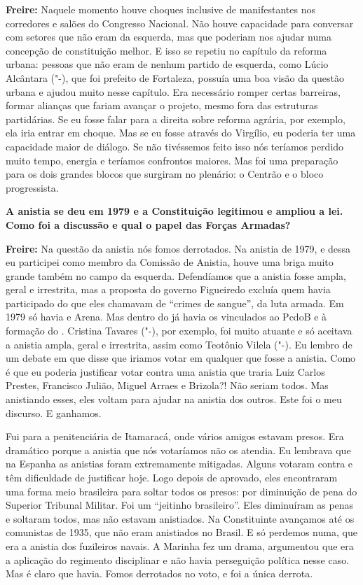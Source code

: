 \textbf{Freire:} Naquele momento houve choques inclusive de
manifestantes nos corredores e salões do Congresso Nacional. Não houve
capacidade para conversar com setores que não eram da esquerda, mas que
poderiam nos ajudar numa concepção de constituição melhor. E isso se
repetiu no capítulo da reforma urbana: pessoas que não eram de nenhum
partido de esquerda, como Lúcio Alcântara ("-), que foi prefeito de
Fortaleza, possuía uma boa visão da questão urbana e ajudou muito nesse
capítulo. Era necessário romper certas barreiras, formar alianças que
fariam avançar o projeto, mesmo fora das estruturas partidárias. Se eu
fosse falar para a direita sobre reforma agrária, por exemplo, ela iria
entrar em choque. Mas se eu fosse através do Virgílio, eu poderia ter
uma capacidade maior de diálogo. Se não tivéssemos feito isso nós
teríamos perdido muito tempo, energia e teríamos confrontos maiores. Mas
foi uma preparação para os dois grandes blocos que surgiram no plenário:
o Centrão e o bloco progressista.

\textbf{A anistia se deu em 1979 e a Constituição legitimou e ampliou a
lei. Como foi a discussão e qual o papel das Forças Armadas?}

\textbf{Freire:} Na questão da anistia nós fomos derrotados. Na anistia
de 1979, e dessa eu participei como membro da Comissão de Anistia, houve
uma briga muito grande também no campo da esquerda. Defendíamos que a
anistia fosse ampla, geral e irrestrita, mas a proposta do governo
Figueiredo excluía quem havia participado do que eles chamavam de
``crimes de sangue'', da luta armada. Em 1979 só havia  e Arena. Mas
dentro do  já havia os vinculados ao PcdoB e à formação do .
Cristina Tavares ("-), por exemplo, foi muito atuante e só aceitava
a anistia ampla, geral e irrestrita, assim como Teotônio Vilela
("-). Eu lembro de um debate em que disse que iriamos votar em
qualquer que fosse a anistia. Como é que eu poderia justificar votar
contra uma anistia que traria Luiz Carlos Prestes, Francisco Julião,
Miguel Arraes e Brizola?! Não seriam todos. Mas anistiando esses, eles
voltam para ajudar na anistia dos outros. Este foi o meu discurso. E
ganhamos.

Fui para a penitenciária de Itamaracá, onde vários amigos estavam
presos. Era dramático porque a anistia que nós votaríamos não os
atendia. Eu lembrava que na Espanha as anistias foram extremamente
mitigadas. Alguns votaram contra e têm dificuldade de justificar hoje.
Logo depois de aprovado, eles encontraram uma forma meio brasileira para
soltar todos os presos: por diminuição de pena do Superior Tribunal
Militar. Foi um ``jeitinho brasileiro''. Eles diminuíram as penas e
soltaram todos, mas não estavam anistiados. Na Constituinte avançamos
até os comunistas de 1935, que não eram anistiados no Brasil. E só
perdemos numa, que era a anistia dos fuzileiros navais. A Marinha fez um
drama, argumentou que era a aplicação do regimento disciplinar e não
havia perseguição política nesse caso. Mas é claro que havia. Fomos
derrotados no voto, e foi a única derrota.

